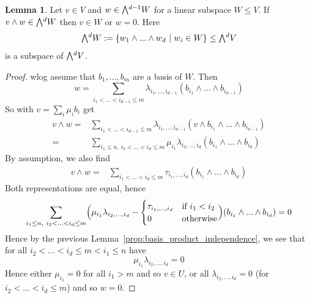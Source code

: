 \documentclass{scrartcl}
\newcommand{\extpow}{\mathchoice{{\textstyle\bigwedge}}
    {{\bigwedge}}
    {{\textstyle\wedge}}
    {{\scriptstyle\wedge}}}
\theoremstyle{definition}
\newtheorem{lemma}[subsection]{Lemma}
\begin{document}
\begin{lemma}
    \label{prop:subspace_closed}
    Let $v \in V$ and $w \in \extpow^{d - 1} W$ for a linear subspace $W \leq V$. 
    If $v \wedge w \in \extpow^d W$ then $v \in W$ or $w = 0$.
    Here
    \begin{equation*}
        \extpow^d W := \{ w_1 \wedge ... \wedge w_d \ | \ w_i \in W \} \leq \extpow^d V
    \end{equation*}
    is a subspace of $\extpow^d V$.
\end{lemma}
\begin{proof}
    wlog assume that $b_1, ..., b_m$ are a basis of $W$.
    Then
    \begin{equation*}
        w = \sum_{i_1 < ... < i_{d - 1} \leq m} \lambda_{i_1, ..., i_{d - 1}} (b_{i_1} \wedge ... \wedge b_{i_{d - 1}})
    \end{equation*}
    So with $v = \sum_i \mu_i b_i$ get
    \begin{align*}
        v \wedge w =& \sum_{i_1 < ... < i_{d - 1} \leq m} \lambda_{i_1, ..., i_{d - 1}} (v \wedge b_{i_1} \wedge ... \wedge b_{i_{d - 1}}) \\
        =& \sum_{i_1 \leq n, \ i_2 < ... < i_d \leq m} \mu_{i_1} \lambda_{i_2, ..., i_d} (b_{i_1} \wedge ... \wedge b_{i_d})
    \end{align*}
    By assumption, we also find
    \begin{align*}
        v \wedge w =& \sum_{i_1 < ... < i_d \leq m} \tau_{i_1, ..., i_d} (b_{i_1} \wedge ... \wedge b_{i_d})
    \end{align*}
    Both representations are equal, hence
    \begin{equation*}
        \sum_{i_1 \leq n, \ i_2 < ... < i_d \leq m} \Bigl( \mu_{i_1}\lambda_{i_2, ..., i_d} - \begin{cases}
            \tau_{i_1, ..., i_d} & \text{if $i_1 < i_2$} \\
            0 & \text{otherwise}
        \end{cases} \Bigr) (b_{i_1} \wedge ... \wedge b_{i_d}) = 0
    \end{equation*}
    Hence by the previous Lemma~\ref{prop:basis_product_independence}, we see that for all $i_2 < ... < i_d \leq m < i_1 \leq n$ have
    \begin{equation*}
        \mu_{i_1} \lambda_{i_2, ..., i_d} = 0
    \end{equation*}
    Hence either $\mu_{i_1} = 0$ for all $i_1 > m$ and so $v \in U$, or all $\lambda_{i_2, ..., i_d} = 0$ (for $i_2 < ... < i_d \leq m$) and so $w = 0$.
\end{proof}
\end{document}
